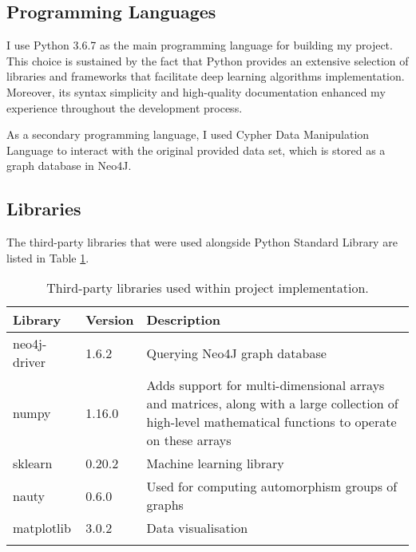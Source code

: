 \subsection{Programming Languages}

I use Python 3.6.7 as the main programming language for building my project. This choice is sustained by the fact that Python provides an extensive selection of libraries and frameworks that facilitate deep learning algorithms implementation. Moreover, its syntax simplicity and high-quality documentation enhanced my experience throughout the development process. \smallskip

As a secondary programming language, I used Cypher Data Manipulation Language to interact with the original provided data set, which is stored as a graph database in Neo4J.

\subsection{Libraries}

The third-party libraries that were used alongside Python Standard Library are listed in Table \ref{Libraries}. \bigskip

\begin{longtable}{|p{}|p{}|p{}|}
  \hline
  \textbf{Library} & \textbf{Version} & \textbf{Description}                                                                                                                                   \\
  \hline
  neo4j-driver     & 1.6.2            & Querying Neo4J graph database                                                                                                                          \\

  numpy            & 1.16.0           & Adds support for multi-dimensional arrays and matrices, along with a large collection of high-level mathematical functions to operate on these arrays \\

  sklearn          & 0.20.2           & Machine learning library                                                                                                                               \\

  nauty            & 0.6.0            & Used for computing automorphism groups of graphs                                                                                                       \\

  matplotlib       & 3.0.2            & Data visualisation                                                                                                                                     \\


  \hline
  \caption[Libraries]{Third-party libraries used within project implementation.}
  \label{Libraries}
\end{longtable} \bigskip

